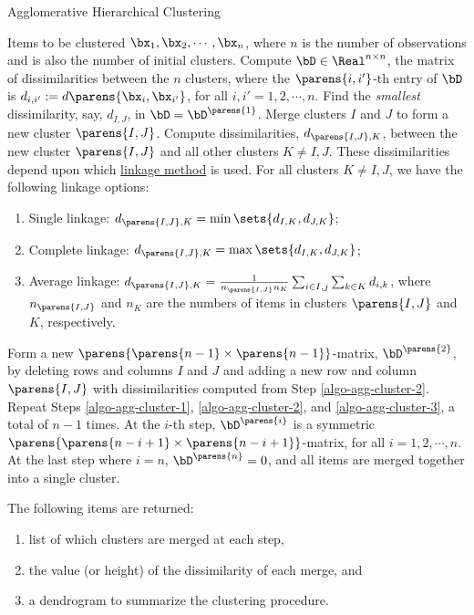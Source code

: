 \documentclass[12pt]{article}
\begin{document}
\begin{enumerate}[label=\textbf{\arabic*.}]
\begin{enumerate}
		\begin{minipage}{\linewidth}
			\begin{algorithm}[H]
				\caption{Agglomerative Hierarchical Clustering}\label{algo-agg-cluster}
				\begin{algorithmic}[1]
					\REQUIRE Items to be clustered $\bx_1, \bx_2, \cdots, \bx_n$, where $n$ is the number of observations and is also the number of initial clusters. 
					\STATE Compute $\bD \in \Real^{n \times n}$, the matrix of dissimilarities between the $n$ clusters, where the $\parens{i, i'}$-th entry of $\bD$ is $d_{i,i'} := d \parens{\bx_i, \bx_{i'}}$, for all $i, i' = 1, 2, \cdots, n$. 
					\STATE \label{algo-agg-cluster-1}Find the \emph{smallest} dissimilarity, say, $d_{I,J}$, in $\bD = \bD^{\parens{1}}$. Merge clusters $I$ and $J$ to form a new cluster $\parens{I, J}$. 
					\STATE \label{algo-agg-cluster-2} Compute dissimilarities, $d_{\parens{I, J}, K}$, between the new cluster $\parens{I, J}$ and all other clusters $K \neq I, J$. These dissimilarities depend upon which \underline{linkage method} is used. For all clusters $K \neq I, J$, we have the following linkage options: 
					\begin{enumerate}
						\item Single linkage: $d_{\parens{I, J}, K} = \min \sets{d_{I, K}, d_{J, K} }$; 
						\item Complete linkage: $d_{\parens{I, J}, K} = \max \sets{d_{I, K}, d_{J, K} }$; 
						\item Average linkage: $d_{\parens{I, J}, K} = \frac{1}{n_{\parens{I, J}} n_K} \sum_{i \in I, j} \sum_{k \in K} d_{i, k}$, where $n_{\parens{I, J}}$ and $n_K$ are the numbers of items in clusters $\parens{I, J}$ and $K$, respectively. 
					\end{enumerate}
					\STATE \label{algo-agg-cluster-3} Form a new $\parens{ \parens{n - 1} \times \parens{n - 1}}$-matrix, $\bD^{\parens{2}}$, by deleting rows and columns $I$ and $J$ and adding a new row and column $\parens{I, J}$ with dissimilarities computed from Step \ref{algo-agg-cluster-2}. 
					\STATE Repeat Steps \ref{algo-agg-cluster-1}, \ref{algo-agg-cluster-2}, and \ref{algo-agg-cluster-3}, a total of $n-1$ times. At the $i$-th step, $\bD^{\parens{i}}$ is a symmetric $\parens{ \parens{n-i+1} \times \parens{n-i+1}}$-matrix, for all $i = 1, 2, \cdots, n$. At the last step where $i = n$, $\bD^{\parens{n}} = 0$, and all items are merged together into a single cluster. 
					
					\RETURN The following items are returned: 
					\begin{enumerate}
						\item list of which clusters are merged at each step, 
						\item the value (or height) of the dissimilarity of each merge, and 
						\item a dendrogram to summarize the clustering procedure. 
					\end{enumerate}
					

\end{algorithmic}
\end{algorithm}
\end{minipage}
\end{enumerate}
\end{enumerate}
\end{document}

